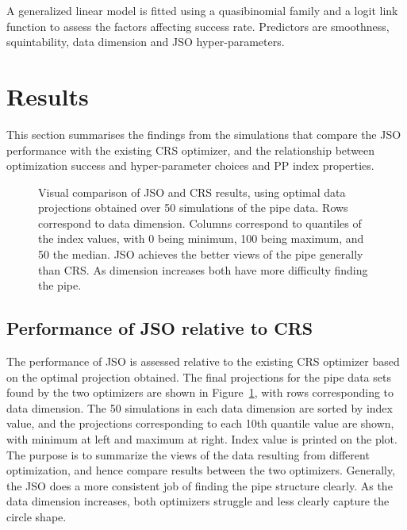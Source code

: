 \documentclass[
  12pt,
]{interact}
\makeatletter
\newcommand*\pandocbounded[1]{%
  \sbox\pandoc@box{#1}%
  \Gscale@div\@tempa{\textheight}{\dimexpr\ht\pandoc@box+\dp\pandoc@box\relax}%
  \Gscale@div\@tempb{\linewidth}{\wd\pandoc@box}%
  \ifdim\@tempb\p@<\@tempa\p@\let\@tempa\@tempb\fi%
  \ifdim\@tempa\p@<\p@\scalebox{\@tempa}{\usebox\pandoc@box}%
  \else\usebox{\pandoc@box}%
  \fi%
}
\theoremstyle{plain}
\makeatother
\begin{document}
A generalized linear model is fitted using a quasibinomial family and a
logit link function to assess the factors affecting success rate.
Predictors are smoothness, squintability, data dimension and JSO
hyper-parameters.

\section{Results}\label{sec-sim-res}

This section summarises the findings from the simulations that compare
the JSO performance with the existing CRS optimizer, and the
relationship between optimization success and hyper-parameter choices
and PP index properties.

\begin{figure}

\centering{

\pandocbounded{\texttt{[image: jso\_files/figure-pdf/fig-proj-1.pdf]}}

}

\caption{\label{fig-proj}Visual comparison of JSO and CRS results, using
optimal data projections obtained over 50 simulations of the pipe data.
Rows correspond to data dimension. Columns correspond to quantiles of
the index values, with 0 being minimum, 100 being maximum, and 50 the
median. JSO achieves the better views of the pipe generally than CRS. As
dimension increases both have more difficulty finding the pipe.}

\end{figure}%

\subsection{Performance of JSO relative to
CRS}\label{performance-of-jso-relative-to-crs}

The performance of JSO is assessed relative to the existing CRS
optimizer based on the optimal projection obtained. The final
projections for the pipe data sets found by the two optimizers are shown
in Figure~\ref{fig-proj}, with rows corresponding to data dimension. The
50 simulations in each data dimension are sorted by index value, and the
projections corresponding to each 10th quantile value are shown, with
minimum at left and maximum at right. Index value is printed on the
plot. The purpose is to summarize the views of the data resulting from
different optimization, and hence compare results between the two
optimizers. Generally, the JSO does a more consistent job of finding the
pipe structure clearly. As the data dimension increases, both optimizers
struggle and less clearly capture the circle shape.
\end{document}
